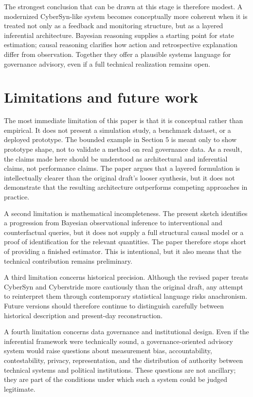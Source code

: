 \documentclass[11pt]{article}
\begin{document}
The strongest conclusion that can be drawn at this stage is therefore modest. A modernized CyberSyn-like system becomes conceptually more coherent when it is treated not only as a feedback and monitoring structure, but as a layered inferential architecture. Bayesian reasoning supplies a starting point for state estimation; causal reasoning clarifies how action and retrospective explanation differ from observation. Together they offer a plausible systems language for governance advisory, even if a full technical realization remains open.

\section{Limitations and future work}

The most immediate limitation of this paper is that it is conceptual rather than empirical. It does not present a simulation study, a benchmark dataset, or a deployed prototype. The bounded example in Section 5 is meant only to show prototype shape, not to validate a method on real governance data. As a result, the claims made here should be understood as architectural and inferential claims, not performance claims. The paper argues that a layered formulation is intellectually clearer than the original draft's looser synthesis, but it does not demonstrate that the resulting architecture outperforms competing approaches in practice.

A second limitation is mathematical incompleteness. The present sketch identifies a progression from Bayesian observational inference to interventional and counterfactual queries, but it does not supply a full structural causal model or a proof of identification for the relevant quantities. The paper therefore stops short of providing a finished estimator. This is intentional, but it also means that the technical contribution remains preliminary.

A third limitation concerns historical precision. Although the revised paper treats CyberSyn and Cyberstride more cautiously than the original draft, any attempt to reinterpret them through contemporary statistical language risks anachronism. Future versions should therefore continue to distinguish carefully between historical description and present-day reconstruction.

A fourth limitation concerns data governance and institutional design. Even if the inferential framework were technically sound, a governance-oriented advisory system would raise questions about measurement bias, accountability, contestability, privacy, representation, and the distribution of authority between technical systems and political institutions. These questions are not ancillary; they are part of the conditions under which such a system could be judged legitimate.
\end{document}
